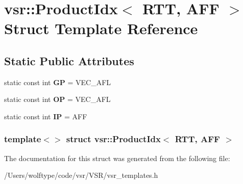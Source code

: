 \hypertarget{structvsr_1_1_product_idx_3_01_r_t_t_00_01_a_f_f_01_4}{\section{vsr\-:\-:Product\-Idx$<$ R\-T\-T, A\-F\-F $>$ Struct Template Reference}
\label{structvsr_1_1_product_idx_3_01_r_t_t_00_01_a_f_f_01_4}
}
\subsection*{Static Public Attributes}
\begin{DoxyCompactItemize}
\item 
\hypertarget{structvsr_1_1_product_idx_3_01_r_t_t_00_01_a_f_f_01_4_a96ccffbf0f06ae5f42cc483d52349c99}{static const int {\bfseries G\-P} = V\-E\-C\-\_\-\-A\-F\-L}\label{structvsr_1_1_product_idx_3_01_r_t_t_00_01_a_f_f_01_4_a96ccffbf0f06ae5f42cc483d52349c99}

\item 
\hypertarget{structvsr_1_1_product_idx_3_01_r_t_t_00_01_a_f_f_01_4_a354ab9a262d60961dfa1118f31bba721}{static const int {\bfseries O\-P} = V\-E\-C\-\_\-\-A\-F\-L}\label{structvsr_1_1_product_idx_3_01_r_t_t_00_01_a_f_f_01_4_a354ab9a262d60961dfa1118f31bba721}

\item 
\hypertarget{structvsr_1_1_product_idx_3_01_r_t_t_00_01_a_f_f_01_4_a81d72ef120c776285b3fdda60a55ed0d}{static const int {\bfseries I\-P} = A\-F\-F}\label{structvsr_1_1_product_idx_3_01_r_t_t_00_01_a_f_f_01_4_a81d72ef120c776285b3fdda60a55ed0d}

\end{DoxyCompactItemize}
\subsubsection*{template$<$$>$ struct vsr\-::\-Product\-Idx$<$ R\-T\-T, A\-F\-F $>$}



The documentation for this struct was generated from the following file\-:\begin{DoxyCompactItemize}
\item 
/\-Users/wolftype/code/vsr/\-V\-S\-R/vsr\-\_\-templates.\-h\end{DoxyCompactItemize}

